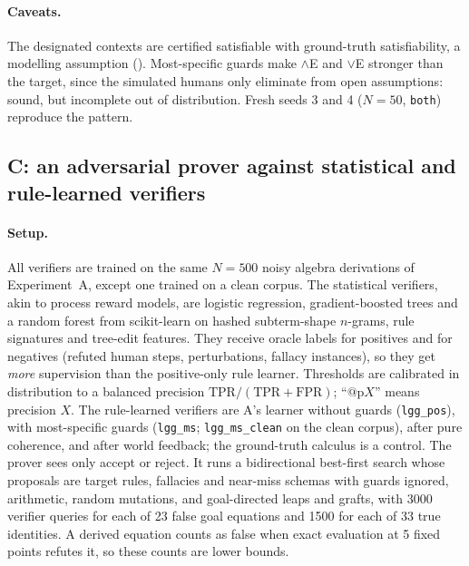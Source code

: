 \paragraph{Caveats.} The designated contexts are certified satisfiable with ground-truth satisfiability, a modelling assumption (). Most-specific guards make $\wedge$E and $\vee$E stronger than the target, since the simulated humans only eliminate from open assumptions: sound, but incomplete out of distribution. Fresh seeds 3 and 4 ($N=50$, \texttt{both}) reproduce the pattern.

\subsection{C: an adversarial prover against statistical and rule-learned verifiers}\label{sec:experiments:adversarial}

\paragraph{Setup.} All verifiers are trained on the same $N=500$ noisy algebra derivations of Experiment~A, except one trained on a clean corpus. The statistical verifiers, akin to process reward models, are logistic regression, gradient-boosted trees and a random forest from scikit-learn \citep{pedregosa2011scikit} on hashed subterm-shape $n$-grams, rule signatures and tree-edit features. They receive oracle labels for positives and for negatives (refuted human steps, perturbations, fallacy instances), so they get \emph{more} supervision than the positive-only rule learner. Thresholds are calibrated in distribution to a balanced precision $\mathrm{TPR}/(\mathrm{TPR}+\mathrm{FPR})$; ``$@\mathrm pX$'' means precision $X$. The rule-learned verifiers are A's learner without guards (\texttt{lgg\_pos}), with most-specific guards (\texttt{lgg\_ms}; \texttt{lgg\_ms\_clean} on the clean corpus), after pure coherence, and after world feedback; the ground-truth calculus is a control. The prover sees only accept or reject. It runs a bidirectional best-first search whose proposals are target rules, fallacies and near-miss schemas with guards ignored, arithmetic, random mutations, and goal-directed leaps and grafts, with 3000 verifier queries for each of 23 false goal equations and 1500 for each of 33 true identities. A derived equation counts as false when exact evaluation at 5 fixed points refutes it, so these counts are lower bounds.

